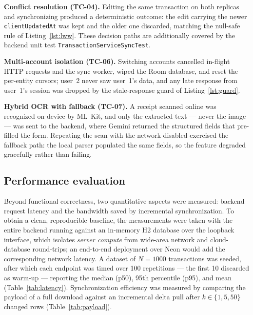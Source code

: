 \documentclass[13pt,a4paper]{extarticle}
\begin{document}
\noindent\textbf{Conflict resolution (TC-04).} Editing the same transaction on both replicas and
synchronizing produced a deterministic outcome: the edit carrying the newer \texttt{clientUpdatedAt}
was kept and the older one discarded, matching the null-safe rule of Listing~\ref{lst:lww}. These
decision paths are additionally covered by the backend unit test \texttt{TransactionServiceSyncTest}.

\noindent\textbf{Multi-account isolation (TC-06).} Switching accounts cancelled in-flight HTTP
requests and the sync worker, wiped the Room database, and reset the per-entity cursors; user~2 never
saw user~1's data, and any late response from user~1's session was dropped by the stale-response
guard of Listing~\ref{lst:guard}.

\noindent\textbf{Hybrid OCR with fallback (TC-07).} A receipt scanned online was recognized
on-device by ML~Kit, and only the extracted text --- never the image --- was sent to the backend,
where Gemini returned the structured fields that pre-filled the form. Repeating the scan with the
network disabled exercised the fallback path: the local parser populated the same fields, so the
feature degraded gracefully rather than failing.

\subsection{Performance evaluation}
Beyond functional correctness, two quantitative aspects were measured: backend request latency and
the bandwidth saved by incremental synchronization. To obtain a clean, reproducible baseline, the
measurements were taken with the entire backend running against an in-memory H2 database over the
loopback interface, which isolates \emph{server compute} from wide-area network and cloud-database
round-trips; an end-to-end deployment over Neon would add the corresponding network latency. A
dataset of $N=1000$ transactions was seeded, after which each endpoint was timed over 100
repetitions --- the first 10 discarded as warm-up --- reporting the median (p50), 95th percentile
(p95), and mean (Table~\ref{tab:latency}). Synchronization efficiency was measured by comparing the
payload of a full download against an incremental delta pull after $k\in\{1,5,50\}$ changed rows
(Table~\ref{tab:payload}).
\end{document}
